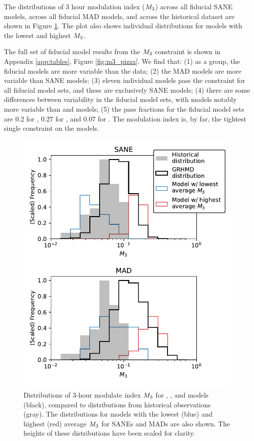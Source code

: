 
The distributions of 3 hour modulation index ($M_{3}$) across all fiducial SANE models, across all fiducial MAD models, and across the historical dataset are shown in Figure \ref{fig:cmp_ALMA_var}.  The plot also shows individual distributions for models with the lowest and highest $M_{3}$.  

The full set of fiducial model results from the $M_{3}$ constraint is shown in Appendix \ref{app:tables}, Figure \ref{fig:m3_pizza}.  
We find that: (1) as a group, the fiducial models are more variable than the data; (2) the MAD models are more variable than SANE models; (3) eleven individual models  pass the constraint for all fiducial model sets, and these are exclusively SANE models; (4) there are some differences between variability in the fiducial model sets, with \hamr models notably more variable than \kharma and \bhac models; (5) the pass fractions for the fiducial model sets are $0.2$ for \kharma, $0.27$ for \bhac, and $0.07$ for \hamr.   The modulation index is, by far, the tightest single constraint on the models.  

\begin{figure}
  \centering
  \includegraphics[width=\columnwidth]{./figures/mi_hist.pdf}
  \caption{Distributions of 3-hour modulate index $M_{3}$ for \bhac, \kharma, and \hamr models (black), compared to distributions from historical observations (gray). The distributions for models with the lowest (blue) and highest (red) average $M_{3}$ for SANEs and MADs are also shown. The heights of these distributions have been scaled for clarity.
  }
  \label{fig:cmp_ALMA_var}
\end{figure}

